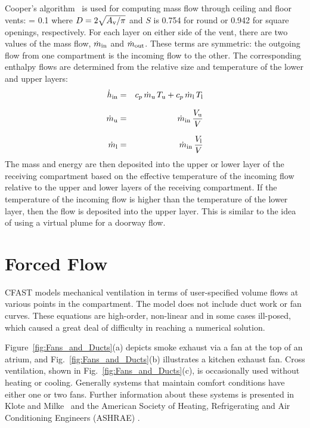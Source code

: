 Cooper's algorithm~\cite{Cooper:1989, Cooper:1990, Cooper:1995} is used for computing mass flow through ceiling and floor vents:
\be
   \dm = 0.1  
\ee
where $D = 2 \sqrt{A_{\rm v} / \pi}$ and $S$ is 0.754 for round or 0.942 for square openings, respectively. For each layer on either side of the vent, there are two values of the mass flow, $\dot{m}_{\rm in}$ and $\dot{m}_{\rm out}$. These terms are symmetric: the outgoing flow from one compartment is the incoming flow to the other. The corresponding enthalpy flows are determined from the relative size and temperature of the lower and upper layers:
\begin{eqnarray}
  \dot{h}_{\rm in} &=& c_p \, \dot{m}_{\rm u} \, T_{\rm u} + c_p \, \dot{m}_{\rm l} \, T_{\rm l} \\[0.1in]
  \dot{m}_{\rm u} &=& \dot{m}_{\rm in} \, \frac{V_{\rm u}}{V} \\[0.1in]
  \dot{m}_{\rm l} &=& \dot{m}_{\rm in} \, \frac{V_{\rm l}}{V}
\end{eqnarray}
The mass and energy are then deposited into the upper or lower layer of the receiving compartment based on the effective temperature of the incoming flow relative to the upper and lower layers of the receiving compartment. If the temperature of the incoming flow is higher than the temperature of the lower layer, then the flow is deposited into the upper layer. This is similar to the idea of using a virtual plume for a doorway flow.


\section{Forced Flow}

CFAST models mechanical ventilation in terms of user-specified volume flows at various points in the compartment. The model does not include duct work or fan curves. These equations are high-order, non-linear and in some cases ill-posed, which caused a great deal of difficulty in reaching a numerical solution.

Figure~\ref{fig:Fans_and_Ducts}(a) depicts smoke exhaust via a fan at the top of an atrium, and Fig.~\ref{fig:Fans_and_Ducts}(b) illustrates a kitchen exhaust fan.  Cross ventilation, shown in Fig.~\ref{fig:Fans_and_Ducts}(c), is occasionally used without heating or cooling.  Generally systems that maintain comfort conditions have either one or two fans. Further information about these systems is presented in Klote and Milke~\cite{Klote:2002} and the American Society of Heating, Refrigerating and Air Conditioning Engineers (ASHRAE) \cite{ASHRAE:2001}.

